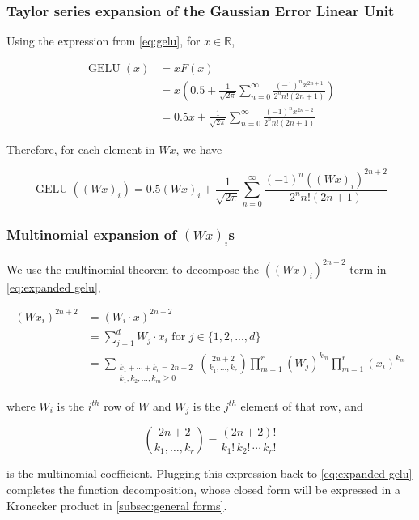 \documentclass{article}
\begin{document}
\subsubsection{Taylor series expansion of the Gaussian Error Linear Unit}

Using the expression from \eqref{eq:gelu}, for $x\in \mathbb{R}$,

\begin{align*}
\operatorname{GELU}(x) &= x F(x)\\
&= x \left(0.5 + \frac{1}{\sqrt{2\pi}}\sum_{n=0}^{\infty}\frac{(-1)^n x^{2n+1}}{2^n n!(2n+1)}\right)\\
&= 0.5x + \frac{1}{\sqrt{2\pi}} \sum_{n=0}^\infty \frac{(-1)^n x^{2n+2}}{2^n n!(2n+1)}
\end{align*}

Therefore, for each element in $Wx$, we have

\begin{equation}
\operatorname{GELU}((Wx)_i) = 0.5 (Wx)_i + \frac{1}{\sqrt{2\pi}}\sum_{n=0}^{\infty}\frac{(-1)^n ((Wx)_i)^{2n+2}}{2^n n!(2n+1)}
\label{eq:expanded gelu}
\end{equation}

\subsubsection{Multinomial expansion of $(Wx)_i$s}

We use the multinomial theorem to decompose the $((Wx)_i)^{2n+2}$ term in \eqref{eq:expanded gelu}, 

\begin{align*}
(Wx_i)^{2n+2} &= \left( W_i\cdot x \right)^{2n+2}\\
&= \sum_{j=1}^d W_j \cdot x_i \text{ for } j \in \{1,2,...,d\}\\
&= \sum_{\substack{k_1 + \cdots + k_r = 2n+2\\
k_1, k_2 , \ldots, k_m \geq 0
}}
    \binom{2n+2}{k_1, \ldots, k_r}
    \prod_{m=1}^r (W_{j})^{k_m}
    \prod_{m=1}^r (x_i)^{k_m}
\end{align*}

where $W_i$ is the $i^{th}$ row of $W$ and $W_j$ is the $j^{th}$ element of that row, and

$$
\binom{2n+2}{k_1, \ldots, k_r} = 
\frac{(2n+2)!}{k_1! \, k_2! \, \cdots \, k_r!}
$$

is the multinomial coefficient. Plugging this expression back to \eqref{eq:expanded gelu} completes the function decomposition, whose closed form will be expressed in a Kronecker product in \ref{subsec:general forms}.
\end{document}

